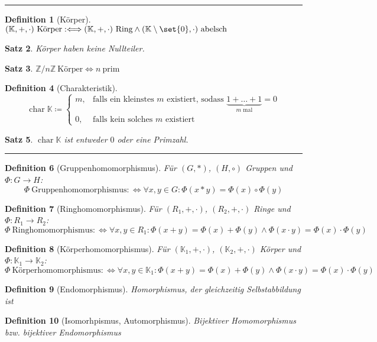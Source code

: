 \documentclass[a4paper]{article}
\newcounter{Sec}
\theoremstyle{marginbreak}
\newtheorem{definition}{Definition}[Sec]
\newtheorem{satz}[definition]{Satz}
\DeclareMathOperator{\chop}{char}
\newcommand{\sep}{%
	\rule{\textwidth}{0.3pt}%
	\stepcounter{Sec}%
	}
\begin{document}
	\sep
	\begin{definition}[Körper]
		$(\mathbb{K}, +, \cdot)~\text{Körper} :\Longleftrightarrow (\mathbb{K}, +, \cdot)~\text{Ring}
		\wedge (\mathbb{K}\setminus\set{0}, \cdot)~\text{abelsch}$
	\end{definition}
	\begin{satz}
		Körper haben keine Nullteiler.
	\end{satz}
	\begin{satz}
		$\mathbb{Z}/n\mathbb{Z}~\text{Körper} \iff n~\text{prim}$
	\end{satz}
	\begin{definition}[Charakteristik]
		\[\chop\mathbb{K} \coloneqq\begin{cases}
			m, &\text{falls ein kleinstes $m$ existiert, sodass $\underbrace{1 + \ldots + 1}_{\text{$m$ mal}} = 0$}\\
			0, & \text{falls kein solches $m$ existiert}
		\end{cases}\]
	\end{definition}
	\begin{satz}
		$\chop\mathbb{K}$ ist entweder $0$ oder eine Primzahl.
	\end{satz}
	\sep
	\begin{definition}[Gruppenhomomorphismus]
		Für $(G, *)$, $(H, \circ)$ Gruppen und $\Phi\colon G \to H$:
		\[\Phi~\text{Gruppenhomomorphismus} :\Longleftrightarrow \forall x, y \in G: \Phi(x * y) = \Phi(x)\circ\Phi(y)\]
	\end{definition}
	\begin{definition}[Ringhomomorphismus]
		Für $(R_1, +, \cdot)$, $(R_2, +, \cdot)$ Ringe und $\Phi\colon R_1\to R_2$:
		\[\Phi~\text{Ringhomomorphismus} :\Longleftrightarrow \forall x, y \in R_1: \Phi(x + y) = \Phi(x) + \Phi(y) \wedge
		\Phi(x \cdot y) = \Phi(x) \cdot \Phi(y)\]
	\end{definition}
	\begin{definition}[Körperhomomorphismus]
		Für $(\mathbb{K}_1, +, \cdot)$, $(\mathbb{K}_2, +, \cdot)$ Körper und $\Phi\colon\mathbb{K}_1\to \mathbb{K}_2$:
		\[\Phi~\text{Körperhomomorphismus} :\Longleftrightarrow \forall x, y \in \mathbb{K}_1: \Phi(x + y) = \Phi(x) + \Phi(y) \wedge
		\Phi(x \cdot y) = \Phi(x) \cdot \Phi(y)\]
	\end{definition}
	\begin{definition}[Endomorphismus]
		Homorphismus, der gleichzeitig Selbstabbildung ist
	\end{definition}
	\begin{definition}[Isomorhpismus, Automorphismus]
		Bijektiver Homomorphismus bzw. bijektiver Endomorphismus
	\end{definition}
\end{document}
